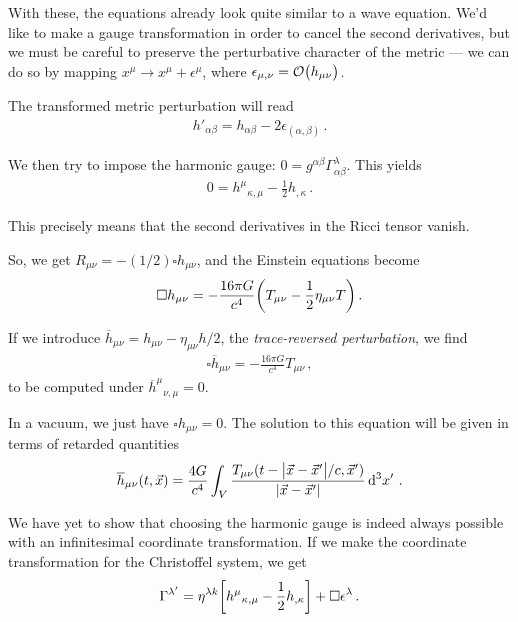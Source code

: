 \documentclass[main.tex]{subfiles}
\begin{document}
With these, the equations already look quite similar to a wave equation. 
We'd like to make a gauge transformation in order to cancel the second derivatives, but we must be careful to preserve the perturbative character of the metric --- we can do so by mapping \(x^{\mu } \to x^{\mu } + \epsilon^\mu \), where \(\epsilon_{\mu , \nu } = \order{h_{\mu \nu }}\). 

The transformed metric perturbation will read 
%
\begin{align}
h'_{\alpha \beta } = h_{\alpha \beta } - 2 \epsilon_{(\alpha , \beta )}
\,.
\end{align}

We then try to impose the harmonic gauge: \(0 = g^{\alpha \beta } \Gamma^{\lambda }_{\alpha \beta }\). This yields 
%
\begin{align}
0 = h^{\mu }{}_{\kappa, \mu } - \frac{1}{2} h_{, \kappa } 
\,.
\end{align}

This precisely means that the second derivatives in the Ricci tensor vanish. 

So, we get \(R_{\mu \nu } = -(1/2) \square h_{\mu \nu }\), and the Einstein equations become 
%
\begin{align}
\square h_{\mu \nu } = - \frac{16 \pi G}{c^{4}} \qty(T_{\mu \nu } - \frac{1}{2} \eta_{\mu \nu } T)
\,.
\end{align}

If we introduce \(\overline{h}_{\mu \nu } = h_{\mu \nu } - \eta_{\mu \nu } h / 2\), the \emph{trace-reversed perturbation}, we find 
%
\begin{align}
\square \overline{h}_{\mu \nu } = - \frac{16 \pi G}{c^{4}} T_{\mu \nu}
\,,
\end{align}
%
to be computed under \(\overline{h}^{\mu }{}_{\nu , \mu } = 0\). 

In a vacuum, we just have \(\square h_{\mu \nu } = 0\). 
The solution to this equation will be given in terms of 
retarded quantities 
%
\begin{align}
\overline{h}_{\mu \nu } (t, \vec{x}) = \frac{4 G}{c^{4}}
\int_{V} \frac{T_{\mu \nu } (t - \abs{\vec{x} - \vec{x}'} / c, \vec{x}')}{\abs{\vec{x} - \vec{x}'}} \dd[3]{x'}
\,.
\end{align}

We have yet to show that choosing the harmonic gauge is indeed always possible with an infinitesimal coordinate transformation. 
If we make the coordinate transformation for the Christoffel system, we get 
%
\begin{align} \label{eq:christoffel-gauge-transformation}
\Gamma^{\lambda '} = \eta^{\lambda k } \qty[h^{\mu }{}_{\kappa, \mu } - \frac{1}{2} h_{, \kappa }] + \square \epsilon^{\lambda }
\,.
\end{align}
\end{document}
